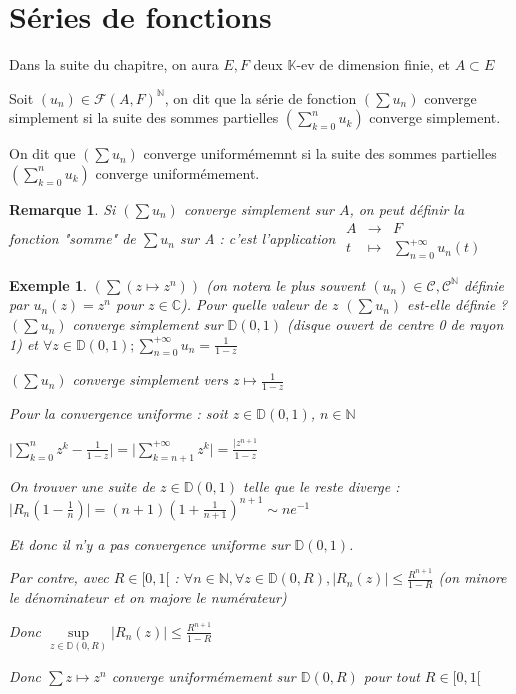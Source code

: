 \documentclass[a4paper,12pt]{book}
\newcommand{\Def}[2]{\begin{tcolorbox}[sharp corners, colback=white,colframe=blue!90!black!75, title=Définition : #1]#2\end{tcolorbox}}
\newtheorem{Exe}{Exemple}[section]
\newtheorem{Rem}{Remarque}[section]
\def\C{\mathbb{C}}
\def\N{\mathbb{N}}
\def\K{\mathbb{K}}
\begin{document}
\section{Séries de fonctions}
Dans la suite du chapitre, on aura $E,F$ deux $\K$-ev de dimension finie, et $A\subset E$
\Def{Convergences}{Soit $(u_n)\in\mathcal{F}(A,F)^\N$, on dit que la série de fonction $(\sum u_n)$ converge simplement si la suite des sommes partielles $\left(\sum\limits_{k=0}^n u_k\right)$ converge simplement.
\par On dit que $(\sum u_n)$ converge uniformémemnt si la suite des sommes partielles $\left(\sum\limits_{k=0}^nu_k\right)$ converge uniformémement.}
\begin{Rem}
Si $(\sum u_n)$ converge simplement sur $A$, on peut définir la fonction "somme" de $\sum u_n$ sur A : c'est l'application $\begin{array}{rcl} A & \to & F \\ t & \mapsto & \sum\limits_{n=0}^{+\infty}u_n(t)\end{array}$
\end{Rem}
\begin{Exe}
$(\sum( z\mapsto z^n))$ (on notera le plus souvent $(u_n)\in\mathcal{C,C}^\N$ définie par $u_n(z)=z^n$ pour $z\in\C$). Pour quelle valeur de $z$ $(\sum u_n)$ est-elle définie ? $(\sum u_n)$ converge simplement sur $\mathbb{D}(0,1)$ (disque ouvert de centre 0 de rayon 1) et $\forall z\in \mathbb{D}(0,1); \sum\limits_{n=0}^{+\infty}u_n=\frac{1}{1-z}$ \par $(\sum u_n)$ converge simplement vers $z\mapsto \frac{1}{1-z}$
\par Pour la convergence uniforme : soit $z\in\mathbb{D}(0,1)$, $n\in\N$ \par $\vert\sum\limits_{k=0}^nz^k - \frac{1}{1-z}\vert = \vert\sum\limits_{k=n+1}^{+\infty} z^k\vert =\frac{\vert z^{n+1}}{1-z}$ \par On trouver une suite de $z\in\mathbb{D}(0,1)$ telle que le reste diverge : $\vert R_n(1-\frac{1}{n})\vert = (n+1)(1+\frac{1}{n+1})^{n+1}\sim ne^{-1}$ \par Et donc il n'y a pas convergence uniforme sur $\mathbb{D}(0,1)$.
\par Par contre, avec $R\in[0,1[$ : $\forall n\in\N,\forall z\in\mathbb{D}(0,R), \vert R_n(z)\vert\leq \frac{R^{n+1}}{1-R}$ (on minore le dénominateur et on majore le numérateur) \par Donc $\sup\limits_{z\in\mathbb{D}(0,R)}\vert R_n(z)\vert\leq \frac{R^{n+1}}{1-R}$ \par Donc $\sum z\mapsto z^n$ converge uniformémement sur $\mathbb{D}(0,R)$ pour tout $R\in[0,1[$
\end{Exe}
\end{document}
